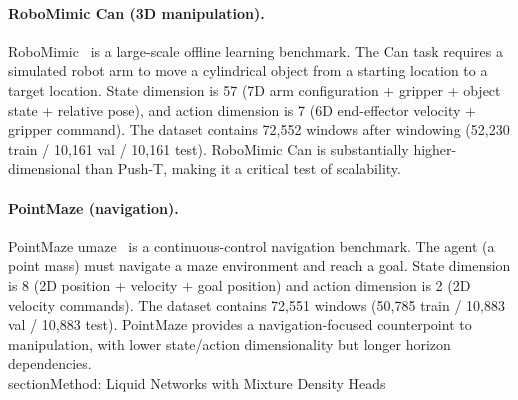 \documentclass{article}
\begin{document}
\paragraph{RoboMimic Can (3D manipulation).}
RoboMimic~\cite{mandlekar2021robomimic} is a large-scale offline learning benchmark. The Can task requires a simulated robot arm to move a cylindrical object from a starting location to a target location. State dimension is 57 (7D arm configuration + gripper + object state + relative pose), and action dimension is 7 (6D end-effector velocity + gripper command). The dataset contains 72{,}552 windows after windowing (52{,}230 train / 10{,}161 val / 10{,}161 test). RoboMimic Can is substantially higher-dimensional than Push-T, making it a critical test of scalability.

\paragraph{PointMaze (navigation).}
PointMaze umaze~\cite{fu2021d4rl} is a continuous-control navigation benchmark. The agent (a point mass) must navigate a maze environment and reach a goal. State dimension is 8 (2D position + velocity + goal position) and action dimension is 2 (2D velocity commands). The dataset contains 72{,}551 windows (50{,}785 train / 10{,}883 val / 10{,}883 test). PointMaze provides a navigation-focused counterpoint to manipulation, with lower state/action dimensionality but longer horizon dependencies.
\\section{Method: Liquid Networks with Mixture Density Heads}
\end{document}
